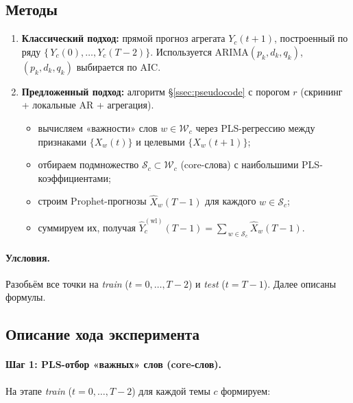 \documentclass[14pt,a4paper]{article}
\begin{document}
\subsection{Методы}

\begin{enumerate}
  \item \textbf{Классический подход:} прямой прогноз агрегата \(Y_c(t+1)\), построенный по ряду 
  \(\{\,Y_c(0),\dots,Y_c(T-2)\}\). Используется ARIMA$(p_k,d_k,q_k)$, $(p_k,d_k,q_k)$ выбирается по AIC.
  \item \textbf{Предложенный подход:} алгоритм \S\ref{ssec:pseudocode} с порогом $r$
      (скрининг + локальные AR + агрегация).
    \begin{itemize}
      \item вычисляем «важности» слов \(w\in\mathcal W_c\) через PLS-регрессию между 
        признаками \(\{X_w(t)\}\) и целевыми \(\{X_w(t+1)\}\);
      \item отбираем подмножество \(\mathcal S_c \subset \mathcal W_c\) (core-слова) с наибольшими PLS-коэффициентами;
      \item строим Prophet-прогнозы \(\widehat{X}_w(T-1)\) для каждого \(w\in\mathcal S_c\);
      \item суммируем их, получая 
      \(\widehat{Y}_c^{(\mathrm{wl})}(T-1) = \sum_{\,w\in\mathcal S_c} \widehat{X}_w(T-1).\)
    \end{itemize}
\end{enumerate}
\paragraph{Улсловия.} Разобьём все точки на \emph{train} (\(t=0,\dots,T-2\)) и \emph{test} (\(t=T-1\)). Далее описаны формулы.






\subsection{Описание хода эксперимента}

\paragraph{Шаг 1: PLS-отбор «важных» слов (core-слов).}

На этапе \emph{train} (\(t=0,\dots,T-2\)) для каждой темы \(c\) формируем:
\end{document}
